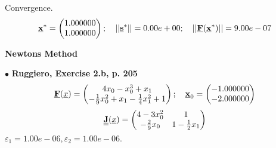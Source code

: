 \documentclass{report}[10pts]
\begin{document}
Convergence.
\[
   \Vector{x}^*=
      \begin{pmatrix*}[r]
      1.000000 \\ 1.000000
      \end{pmatrix*}
   ;\quad
   ||\Vector{s}^*||=
   0.00e+00
   ;\quad
   ||\Vector{F}(\Vector{x}^*)||=
   9.00e-07
\]
\clearpage


   \begin{center}
   \textbf{\Large{Newtons Method}}
   \end{center}
$\bullet$
\textbf{Ruggiero, Exercise 2.b, p. 205}
\[
   \Vector{F}(\underline{x})=
      \begin{pmatrix*}
      4x_0-x_0^3+x_1 \\ -\frac{1}{9}x_0^2+x_1-\frac{1}{4} x_1^2+1
      \end{pmatrix*}
   ;\quad
   \Vector{x}_0=
      \begin{pmatrix*}[r]
      -1.000000 \\ -2.000000
      \end{pmatrix*}
\]
\[
   \Matrix{J}(\underline{x})=
      \begin{pmatrix*}
         4-3x_0^2 & 1\\
         -\frac{2}{9}x_0 & 1-\frac{1}{2}x_1\\
      \end{pmatrix*}
\]
$
\varepsilon_1=1.00e-06,
\varepsilon_2=1.00e-06.
$
\end{document}
